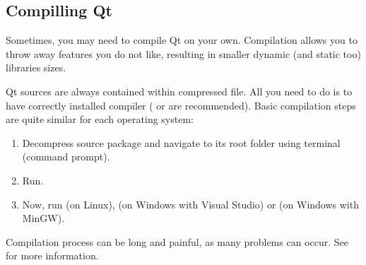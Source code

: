 \subsection{Compilling Qt}
Sometimes, you may need to compile Qt on your own. Compilation allows you to throw away features you do not like, resulting in smaller dynamic (and static too) libraries sizes.

Qt sources are always contained within compressed file. All you need to do is to have correctly installed \cpp compiler ( or  are recommended). Basic compilation steps are quite similar for each operating system:
\begin{enumerate}
\item Decompress source package and navigate to its root folder using terminal (command prompt).
\item Run.
\item Now, run (on Linux), (on Windows with Visual Studio) or (on Windows with MinGW).
\end{enumerate}

Compilation process can be long and painful, as many problems can occur. See \citep{various:qtdoc} for more information.